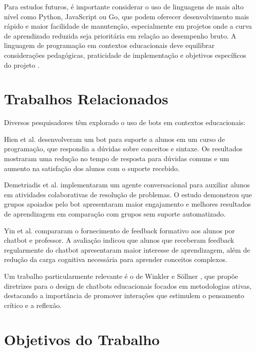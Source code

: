 Para estudos futuros, é importante considerar o uso de linguagens de mais alto nível como Python, JavaScript ou Go, que podem oferecer desenvolvimento mais rápido e maior facilidade de manutenção, especialmente em projetos onde a curva de aprendizado reduzida seja prioritária em relação ao desempenho bruto. A linguagem de programação em contextos educacionais deve equilibrar considerações pedagógicas, praticidade de implementação e objetivos específicos do projeto \cite{pears2007}.


\section{Trabalhos Relacionados}
\label{sec:trab-rel}

Diversos pesquisadores têm explorado o uso de bots em contextos educacionais:

Hien et al. \cite{hien2018} desenvolveram um bot para suporte a alunos em um curso de programação, que respondia a dúvidas sobre conceitos e sintaxe. Os resultados mostraram uma redução no tempo de resposta para dúvidas comuns e um aumento na satisfação dos alunos com o suporte recebido.

Demetriadis et al. \cite{demetriadis2018} implementaram um agente conversacional para auxiliar alunos em atividades colaborativas de resolução de problemas. O estudo demonstrou que grupos apoiados pelo bot apresentaram maior engajamento e melhores resultados de aprendizagem em comparação com grupos sem suporte automatizado.

Yin et al. \cite{yin2024} compararam o fornecimento de feedback formativo aos alunos por chatbot e professor. A avaliação indicou que alunos que receberam feedback regularmente do chatbot apresentaram maior interesse de aprendizagem, além de redução da carga cognitiva necessária para aprender conceitos complexos.

Um trabalho particularmente relevante é o de Winkler e Söllner \cite{winkler2018}, que propõe diretrizes para o design de chatbots educacionais focados em metodologias ativas, destacando a importância de promover interações que estimulem o pensamento crítico e a reflexão.


\section{Objetivos do Trabalho}
\label{sec:objetivos}

